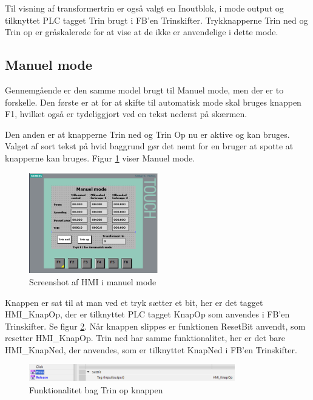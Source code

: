 Til visning af transformertrin er også valgt en Inoutblok, i mode output og tilknyttet PLC tagget Trin brugt i FB'en Trinskifter. Trykknapperne Trin ned og Trin op er gråskalerede for at vise at de ikke er anvendelige i dette mode.

\subsection{Manuel mode}

Gennemgående er den samme model brugt til Manuel mode, men der er to forskelle. Den første er at for at skifte til automatisk mode skal bruges knappen F1, hvilket også er tydeliggjort ved en tekst nederst på skærmen.


Den anden er at knapperne Trin ned og Trin Op nu er aktive og kan bruges. Valget af sort tekst på hvid baggrund gør det nemt for en bruger at spotte at knapperne kan bruges. Figur \ref{fig:HMIManuelModeDesign} viser Manuel mode.

\begin{figure}[H] %
	\centering
	\includegraphics[width=0.5\textwidth]{Figure/HMIManuelModeDesign}
	\caption{Screenshot af HMI i manuel mode}
	\label{fig:HMIManuelModeDesign}
\end{figure}

Knappen er sat til at man ved et tryk sætter et bit, her er det tagget HMI\_KnapOp, der er tilknyttet PLC tagget KnapOp som anvendes i FB'en Trinskifter. Se figur \ref{fig:HMITrinOp}. Når knappen slippes er funktionen ResetBit anvendt, som resetter HMI\_KnapOp. Trin ned har samme funktionalitet, her er det bare HMI\_KnapNed, der anvendes, som er tilknyttet KnapNed i FB'en Trinskifter.

\begin{figure}[H] %
	\centering
	\includegraphics[width=0.8\textwidth]{Figure/HMITrinOp}
	\caption{Funktionalitet bag Trin op knappen}
	\label{fig:HMITrinOp}
\end{figure}

